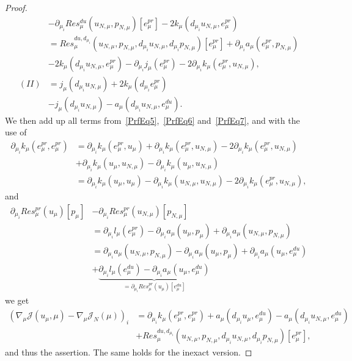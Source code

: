 \begin{proof}
\begin{align}
        &- \partial_{\mu_i} Res_\mu^{du}(u_{N, \mu}, p_{N, \mu})[e_\mu^{pr}] - 2 k_\mu(d_{\mu_i} u_{N, \mu}, e_\mu^{pr}) \nonumber\\
        &= Res_\mu^{du, d_{\mu_i}}(u_{N, \mu}, p_{N, \mu}, d_{\mu_i} u_{N, \mu}, d_{\mu_i} p_{N, \mu})[e_\mu^{pr}] + \partial_{\mu_i} a_\mu(e_\mu^{pr}, p_{N, \mu}) \nonumber\\
        &- 2 k_\mu(d_{\mu_i} u_{N, \mu}, e_\mu^{pr}) - \partial_{\mu_i} j_\mu(e_\mu^{pr}) - 2 \partial_{\mu_i} k_\mu(e_\mu^{pr}, u_{N, \mu}), \nonumber\\
        (II) &= j_\mu(d_{\mu_i} u_{N, \mu}) + 2 k_\mu(d_{\mu_i} e_\mu^{pr}) \label{PrfEq7}\\
        &- j_\mu(d_{\mu_i} u_{N, \mu}) - a_\mu(d_{\mu_i} u_{N, \mu}, e_\mu^{du}). \nonumber
    \end{align}
    We then add up all terms from~\eqref{PrfEq5},~\eqref{PrfEq6} and~\eqref{PrfEq7}, and with the use of
    \begin{align*}
        \partial_{\mu_i} k_\mu(e_\mu^{pr}, e_\mu^{pr}) &= \partial_{\mu_i} k_\mu(e_\mu^{pr}, u_\mu) + \partial_{\mu_i} k_\mu(e_\mu^{pr}, u_{N, \mu}) - 2 \partial_{\mu_i} k_\mu(e_\mu^{pr}, u_{N, \mu}) \\
        &+ \partial_{\mu_i} k_\mu(u_\mu, u_{N, \mu}) - \partial_{\mu_i} k_\mu(u_\mu, u_{N, \mu}) \\
        &= \partial_{\mu_i} k_\mu(u_\mu, u_\mu) - \partial_{\mu_i} k_\mu(u_{N, \mu}, u_{N, \mu}) - 2 \partial_{\mu_i} k_\mu(e_\mu^{pr}, u_{N, \mu}),
    \end{align*}
    and
    \begin{align*}
        \partial_{\mu_i} Res_\mu^{pr}(u_\mu)[p_\mu] &- \partial_{\mu_i} Res_\mu^{pr}(u_{N, \mu})[p_{N, \mu}] \\
        &= \partial_{\mu_i} l_\mu(e_\mu^{pr}) - \partial_{\mu_i} a_\mu(u_\mu, p_\mu) + \partial_{\mu_i} a_\mu(u_{N, \mu}, p_{N, \mu}) \\
        &= \partial_{\mu_i} a_\mu(u_{N, \mu}, p_{N, \mu}) - \partial_{\mu_i} a_\mu(u_\mu, p_\mu) + \partial_{\mu_i} a_\mu(u_\mu, e_\mu^{du}) \\
        &+ \underbrace{\partial_{\mu_i} l_\mu(e_\mu^{du}) - \partial_{\mu_i} a_\mu(u_\mu, e_\mu^{du})}_{= \partial_{\mu_i} Res_\mu^{pr}(u_\mu)[e_\mu^{du}]}
    \end{align*}
    we get
    \begin{align*}
        {\left( \nabla_\mu \mathcal{J}(u_\mu, \mu) - \nabla_\mu \mathcal{J}_N(\mu) \right)}_i &= \partial_{\mu_i} k_\mu(e_\mu^{pr}, e_\mu^{pr}) + a_\mu(d_{\mu_i} u_\mu, e_\mu^{du}) - a_\mu(d_{\mu_i} u_{N, \mu}, e_\mu^{du}) \\
        &+ Res_\mu^{du, d_{\mu_i}}(u_{N, \mu}, p_{N, \mu}, d_{\mu_i} u_{N, \mu}, d_{\mu_i} p_{N, \mu})[e_\mu^{pr}],
    \end{align*}
    and thus the assertion. The same holds for the inexact version.
\end{proof}
